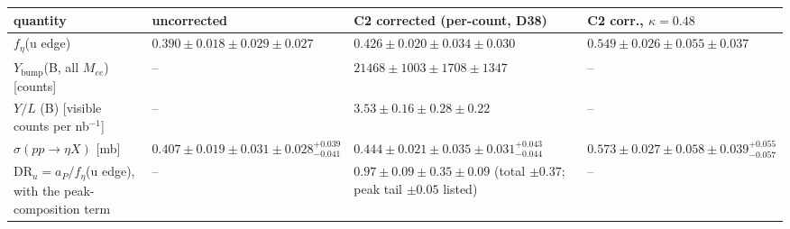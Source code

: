 \begin{tabular}{llll}
\hline
 quantity & uncorrected & C2 corrected (per-count, D38) & C2 corr., $\kappa=0.48$ \\
\hline
 $f_\eta$(u edge) & $0.390\pm0.018\pm0.029\pm0.027$ & $0.426\pm0.020\pm0.034\pm0.030$ & $0.549\pm0.026\pm0.055\pm0.037$ \\
 $Y_{\mathrm{bump}}$(B, all $M_{ee}$) [counts] & -- & $21468\pm1003\pm1708\pm1347$ & -- \\
 $Y/L$ (B) [visible counts per nb$^{-1}$] & -- & $3.53\pm0.16\pm0.28\pm0.22$ & -- \\
 $\sigma(pp\to\eta X)$ [mb] & $0.407\pm0.019\pm0.031\pm0.028^{+0.039}_{-0.041}$ & $0.444\pm0.021\pm0.035\pm0.031^{+0.043}_{-0.044}$ & $0.573\pm0.027\pm0.058\pm0.039^{+0.055}_{-0.057}$ \\
 DR$_u=a_P/f_\eta$(u edge), with the peak-composition term & -- & $0.97\pm0.09\pm0.35\pm0.09$ (total $\pm0.37$; peak tail $\pm0.05$ listed) & -- \\
\hline
\end{tabular}
